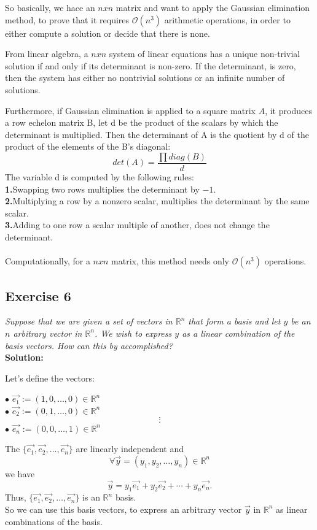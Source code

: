 \documentclass[12pt]{article}
\newcommand{\R}{\mathbb{R}}
\begin{document}
So basically, we hace an $nxn$ matrix and want to apply the Gaussian elimination method, to prove that it requires $\mathcal{O}(n^3)$ arithmetic operations, in order to either compute a solution or decide that there is none. \par 
From linear algebra, a $nxn$ system of linear equations has a unique non-trivial solution if and only if its determinant is non-zero. If the determinant, is zero, then the system has either no nontrivial solutions or an infinite number of solutions. \par 
Furthermore, if Gaussian elimination is applied to a square matrix $A$, it produces a row echelon matrix B, let d be the product of the scalars by which the determinant is multiplied. Then the determinant of A is the quotient by d of the product of the elements of the B's diagonal: 
$$det(A) = \frac{\prod diag(B)}{d}$$
The variable d is computed by the following rules: \\
\textbf{1.}Swapping two rows multiplies the determinant by $-1$. \\
\textbf{2.}Multiplying a row by a nonzero scalar, multiplies the determinant by the same scalar. \\ 
\textbf{3.}Adding to one row a scalar multiple of another, does not change the determinant. \\ \\
Computationally, for a $nxn$ matrix, this method needs only $\mathcal{O}(n^3)$ operations. 
\newpage


\subsection*{Exercise 6}
\textit{Suppose that we are given a set of vectors in $\R^n$ that form a basis and let $y$ be an $n$ arbitrary vector in $\R^n$. We wish to express $y$ as a linear combination of the basis vectors. How can this by accomplished?}\\
\textbf{Solution:} \par
Let's define the vectors: \\
\begin{center}
$\bullet$ $\overrightarrow{e_1} := (1,0,\ldots,0) \in \R^n$ \\
$\bullet$ $\overrightarrow{e_2} := (0,1,\ldots,0) \in \R^n$ 
$$\vdots$$ 
$\bullet$ $\overrightarrow{e_n} := (0,0,\ldots,1) \in \R^n$
\end{center}
The $\lbrace \overrightarrow{e_1}, \overrightarrow{e_2}, \ldots, \overrightarrow{e_n}\rbrace$ are linearly independent and
$$\forall \overrightarrow{y} = (y_1, y_2, \ldots, y_n) \in \R^n$$
we have
$$\overrightarrow{y} = y_1 \overrightarrow{e_1} + y_2 \overrightarrow{e_2} + \cdots + y_n \overrightarrow{e_n}.$$
Thus, $\lbrace \overrightarrow{e_1}, \overrightarrow{e_2}, \ldots, \overrightarrow{e_n}\rbrace$ is an $\R^n$ basis. \\
So we can use this basis vectors, to express an arbitrary vector $\overrightarrow{y}$ in $\R^n$ as linear combinations of the basis. 
\newpage
\end{document}
